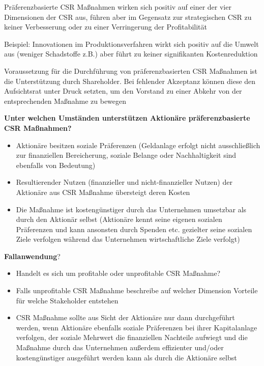 \documentclass[
]{article}
\providecommand{\tightlist}{%
  \setlength{\itemsep}{0pt}\setlength{\parskip}{0pt}}
\begin{document}
Präferenzbasierte CSR Maßnahmen wirken sich positiv auf einer der vier
Dimensionen der CSR aus, führen aber im Gegensatz zur strategischen CSR
zu keiner Verbesserung oder zu einer Verringerung der Profitabilität

Beispiel: Innovationen im Produktionsverfahren wirkt sich positiv auf
die Umwelt aus (weniger Schadstoffe z.B.) aber führt zu keiner
signifikanten Kostenreduktion

Voraussetzung für die Durchführung von präferenzbasierten CSR Maßnahmen
ist die Unterstützung durch Shareholder. Bei fehlender Akzeptanz können
diese den Aufsichtsrat unter Druck setzten, um den Vorstand zu einer
Abkehr von der entsprechenden Maßnahme zu bewegen

\textbf{Unter welchen Umständen unterstützen Aktionäre präferenzbasierte
CSR Maßnahmen?}

\begin{itemize}
\tightlist
\item
  Aktionäre besitzen soziale Präferenzen (Geldanlage erfolgt nicht
  ausschließlich zur finanziellen Bereicherung, soziale Belange oder
  Nachhaltigkeit sind ebenfalls von Bedeutung)
\item
  Resultierender Nutzen (finanzieller und nicht-finanzieller Nutzen) der
  Aktionäre aus CSR Maßnahme übersteigt deren Kosten
\item
  Die Maßnahme ist kostengünstiger durch das Unternehmen umsetzbar als
  durch den Aktionär selbst (Aktionäre kennt seine eigenen sozialen
  Präferenzen und kann ansonsten durch Spenden etc. gezielter seine
  sozialen Ziele verfolgen während das Unternehmen wirtschaftliche Ziele
  verfolgt)
\end{itemize}

\textbf{Fallanwendung}?

\begin{itemize}
\tightlist
\item
  Handelt es sich um profitable oder unprofitable CSR Maßnahme?
\item
  Falls unprofitable CSR Maßnahme beschreibe auf welcher Dimension
  Vorteile für welche Stakeholder entstehen
\item
  CSR Maßnahme sollte aus Sicht der Aktionäre nur dann durchgeführt
  werden, wenn Aktionäre ebenfalls soziale Präferenzen bei ihrer
  Kapitalanlage verfolgen, der soziale Mehrwert die finanziellen
  Nachteile aufwiegt und die Maßnahme durch das Unternehmen außerdem
  effizienter und/oder kostengünstiger ausgeführt werden kann als durch
  die Aktionäre selbst
\end{itemize}
\end{document}

